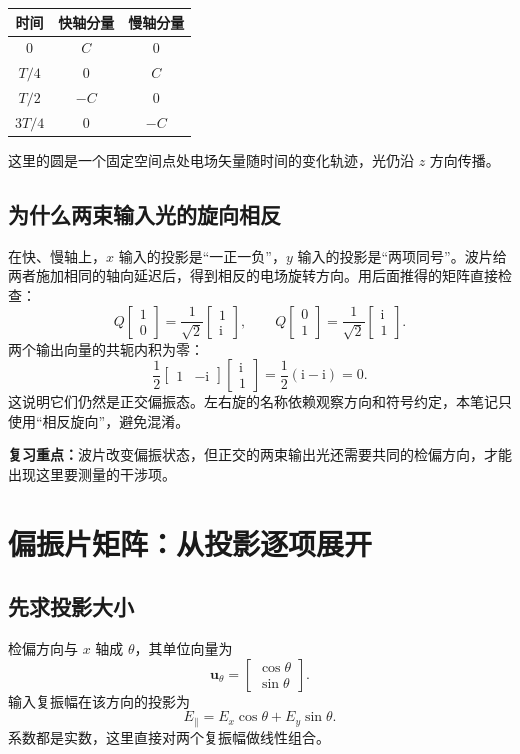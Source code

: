 \documentclass[UTF8,fontset=fandol,11pt,a4paper]{ctexart}
\newcommand{\ii}{\mathrm i}
\newcommand{\note}[1]{\par\noindent\colorbox{pale}{\parbox{\dimexpr\linewidth-2\fboxsep\relax}{\textbf{复习重点：}#1}}\par}
\newcommand{\colvec}[2]{\begin{bmatrix}#1\\#2\end{bmatrix}}
\begin{document}
\begin{center}
\begin{tabular}{ccc}
\toprule
时间 & 快轴分量 & 慢轴分量\\\midrule
$0$ & $C$ & $0$\\
$T/4$ & $0$ & $C$\\
$T/2$ & $-C$ & $0$\\
$3T/4$ & $0$ & $-C$\\
\bottomrule
\end{tabular}
\end{center}
这里的圆是一个固定空间点处电场矢量随时间的变化轨迹，光仍沿 $z$ 方向传播。

\subsection{为什么两束输入光的旋向相反}
在快、慢轴上，$x$ 输入的投影是“一正一负”，$y$ 输入的投影是“两项同号”。波片给两者施加相同的轴向延迟后，得到相反的电场旋转方向。用后面推得的矩阵直接检查：
\begin{equation}
Q\colvec{1}{0}=\frac1{\sqrt2}\colvec{1}{\ii},\qquad
Q\colvec{0}{1}=\frac1{\sqrt2}\colvec{\ii}{1}.
\end{equation}
两个输出向量的共轭内积为零：
\begin{equation}
\frac12\begin{bmatrix}1&-\ii\end{bmatrix}\colvec{\ii}{1}
=\frac12(\ii-\ii)=0.
\end{equation}
这说明它们仍然是正交偏振态。左右旋的名称依赖观察方向和符号约定，本笔记只使用“相反旋向”，避免混淆。

\note{波片改变偏振状态，但正交的两束输出光还需要共同的检偏方向，才能出现这里要测量的干涉项。}

\clearpage
\section{偏振片矩阵：从投影逐项展开}
\subsection{先求投影大小}
检偏方向与 $x$ 轴成 $\theta$，其单位向量为
\begin{equation}
\mathbf u_\theta=\colvec{\cos\theta}{\sin\theta}.
\end{equation}
输入复振幅在该方向的投影为
\begin{equation}
E_\parallel=E_x\cos\theta+E_y\sin\theta.
\end{equation}
系数都是实数，这里直接对两个复振幅做线性组合。
\end{document}
